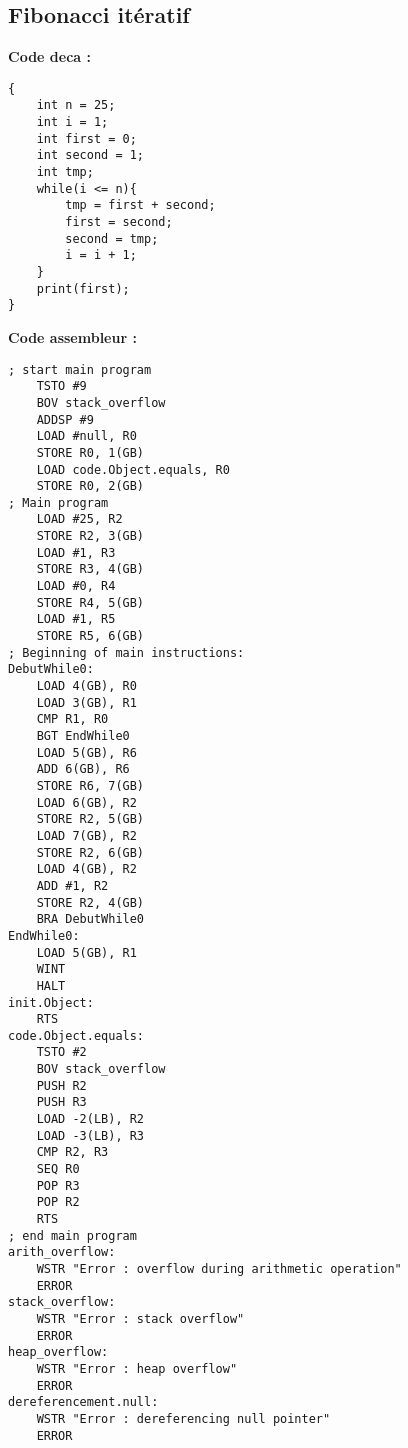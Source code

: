\documentclass[a4,12pt]{article}
\begin{document}
\subsection{Fibonacci itératif}
\textbf{Code deca :} 
\begin{verbatim}
{
    int n = 25;
    int i = 1;
    int first = 0;
    int second = 1;
    int tmp;
    while(i <= n){
        tmp = first + second;
        first = second;
        second = tmp;
        i = i + 1;
    }
    print(first);
}
\end{verbatim}
\textbf{Code assembleur :} 
\begin{verbatim}
; start main program
	TSTO #9
	BOV stack_overflow
	ADDSP #9
	LOAD #null, R0
	STORE R0, 1(GB)
	LOAD code.Object.equals, R0
	STORE R0, 2(GB)
; Main program
	LOAD #25, R2
	STORE R2, 3(GB)
	LOAD #1, R3
	STORE R3, 4(GB)
	LOAD #0, R4
	STORE R4, 5(GB)
	LOAD #1, R5
	STORE R5, 6(GB)
; Beginning of main instructions:
DebutWhile0:
	LOAD 4(GB), R0
	LOAD 3(GB), R1
	CMP R1, R0
	BGT EndWhile0
	LOAD 5(GB), R6
	ADD 6(GB), R6
	STORE R6, 7(GB)
	LOAD 6(GB), R2
	STORE R2, 5(GB)
	LOAD 7(GB), R2
	STORE R2, 6(GB)
	LOAD 4(GB), R2
	ADD #1, R2
	STORE R2, 4(GB)
	BRA DebutWhile0
EndWhile0:
	LOAD 5(GB), R1
	WINT
	HALT
init.Object:
	RTS
code.Object.equals:
	TSTO #2
	BOV stack_overflow
	PUSH R2
	PUSH R3
	LOAD -2(LB), R2
	LOAD -3(LB), R3
	CMP R2, R3
	SEQ R0
	POP R3
	POP R2
	RTS
; end main program
arith_overflow:
	WSTR "Error : overflow during arithmetic operation"
	ERROR
stack_overflow:
	WSTR "Error : stack overflow"
	ERROR
heap_overflow:
	WSTR "Error : heap overflow"
	ERROR
dereferencement.null:
	WSTR "Error : dereferencing null pointer"
	ERROR
\end{verbatim}
\end{document}
